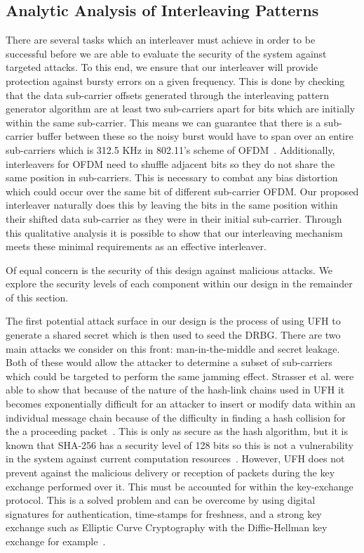 \documentclass[sigconf]{acmart}
\begin{document}
\subsection{Analytic Analysis of Interleaving Patterns}
\label{sub:analyticAnalysis}

There are several tasks which an interleaver must achieve in order to be successful before we are able to evaluate the security of the system against targeted attacks. To this end, we ensure that our interleaver will provide protection against bursty errors on a given frequency. This is done by checking that the data sub-carrier offsets generated through the interleaving pattern generator algorithm are at least two sub-carriers apart for bits which are initially within the same sub-carrier. This means we can guarantee that there is a sub-carrier buffer between these so the noisy burst would have to span over an entire sub-carriers which is 312.5 KHz in 802.11's scheme of OFDM~\cite{ieee80211}. Additionally, interleavers for OFDM need to shuffle adjacent bits so they do not share the same position in sub-carriers. This is necessary to combat any bias distortion which could occur over the same bit of different sub-carrier OFDM. Our proposed interleaver naturally does this by leaving the bits in the same position within their shifted data sub-carrier as they were in their initial sub-carrier. Through this qualitative analysis it is possible to show that our interleaving mechanism meets these minimal requirements as an effective interleaver.

Of equal concern is the security of this design against malicious attacks. We explore the security levels of each component within our design in the remainder of this section.

The first potential attack surface in our design is the process of using UFH to generate a shared secret which is then used to seed the DRBG. There are two main attacks we consider on this front: man-in-the-middle and secret leakage. Both of these would allow the attacker to determine a subset of sub-carriers which could be targeted to perform the same jamming effect. Strasser et al. were able to show that because of the nature of the hash-link chains used in UFH it becomes exponentially difficult for an attacker to insert or modify data within an individual message chain because of the difficulty in finding a hash collision for the a proceeding packet~\cite{strasser2008jamming}. This is only as secure as the hash algorithm, but it is known that SHA-256 has a security level of 128 bits so this is not a vulnerability in the system against current computation resources~\cite{barker2016nist57}. However, UFH does not prevent against the malicious delivery or reception of packets during the key exchange performed over it. This must be accounted for within the key-exchange protocol. This is a solved problem and can be overcome by using digital signatures for authentication, time-stamps for freshness, and a strong key exchange such as Elliptic Curve Cryptography with the Diffie-Hellman key exchange for example~\cite{canetti2001analysis, xie2017provably}.
\end{document}
